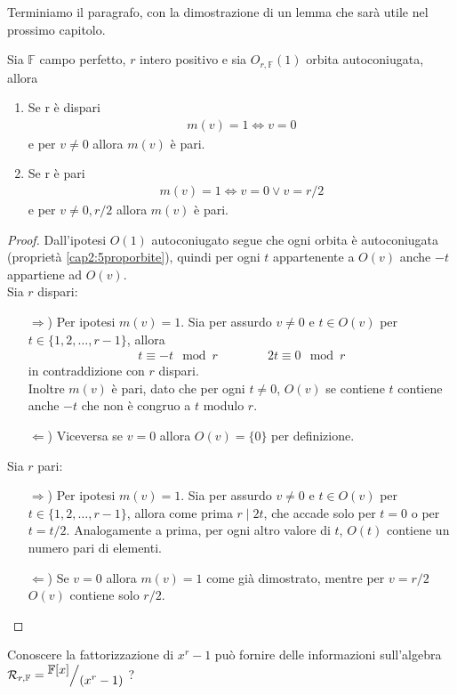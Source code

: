 Terminiamo il paragrafo, con la dimostrazione di un lemma che sarà utile nel prossimo capitolo.
\begin{lemmax} \label{cap2:lemma110}
Sia $\mathbb{F}$ campo perfetto, $r$ intero positivo e sia $O_{r,\mathbb{F}}(1)$ orbita autoconiugata, allora 
\begin{enumerate}
   \item Se r è dispari
      \begin{align*}
         m(v) = 1 \iff v = 0
      \end{align*}
      e per $v \neq 0$ allora $m(v)$ è pari.
   \item Se r è pari
      \begin{align*}
         m(v) = 1 \iff v = 0 \lor v = r/2
      \end{align*}
      e per $v \neq 0, r/2$ allora $m(v)$ è pari.
\end{enumerate}
\end{lemmax}

\begin{proof}
Dall'ipotesi $O(1)$ autoconiugato segue che ogni orbita è autoconiugata (proprietà \ref{cap2:5proporbite}), quindi per ogni $t$ appartenente a $O(v)$ anche $-t$ appartiene ad $O(v)$. \\ 
Sia $r$ dispari:
\begin{itemize}
   \item[$\Rightarrow$)] Per ipotesi $m(v)=1$. Sia per assurdo $v\neq 0$ e $t\in O(v)$ per $t \in \lbrace 1,2,\dots, r-1\rbrace$, allora 
   \begin{align*}
     t \equiv -t \mod{r} \qquad \qquad 2t \equiv 0 \mod{r}   
   \end{align*}
   in contraddizione con $r$ dispari.\\
   Inoltre $m(v)$ è pari, dato che per ogni $t\neq 0$, $O(v)$ se contiene $t$ contiene anche $-t $ che non è congruo a  $t$ modulo $r$.
   \item[$\Leftarrow$)] Viceversa se $v=0$ allora $O(v) = \lbrace 0 \rbrace$ per definizione.
\end{itemize}
Sia $r$ pari:
\begin{itemize} 
   \item[$\Rightarrow$)] Per ipotesi $m(v)=1$. Sia per assurdo $v\neq 0$ e $t\in O(v)$ per $t \in \lbrace 1,2,\dots, r-1\rbrace$, allora come prima $r\mid 2t$, che accade solo per $t=0$ o per $t=t/2$. Analogamente a prima, per ogni altro valore di $t$, $O(t)$ contiene un numero pari di elementi.
   \item[$\Leftarrow$)] Se $v=0$ allora $m(v)=1$ come già dimostrato, mentre per $v=r/2$ $O(v)$ contiene solo $r/2$.
\end{itemize}
\end{proof}
Conoscere la fattorizzazione di $x^r - 1$ può fornire delle informazioni sull'algebra $\mathcal{R}_{r,\mathbb{F}} = \quotient{\mathbb{F} \lbrack x \rbrack  }{(x^{r} - 1)}$ ? 

